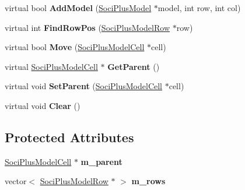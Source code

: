 \begin{DoxyCompactItemize}
\item 
\hypertarget{class_soci_plus_1_1_soci_plus_model_a8b3daf440214ee5e7b8e7fd60ed00c9b}{virtual bool {\bfseries Add\+Model} (\hyperlink{class_soci_plus_1_1_soci_plus_model}{Soci\+Plus\+Model} $\ast$model, int row, int col)}\label{class_soci_plus_1_1_soci_plus_model_a8b3daf440214ee5e7b8e7fd60ed00c9b}

\item 
\hypertarget{class_soci_plus_1_1_soci_plus_model_a190ebe098407b746b61d3beb93cd1d15}{virtual int {\bfseries Find\+Row\+Pos} (\hyperlink{class_soci_plus_1_1_soci_plus_model_row}{Soci\+Plus\+Model\+Row} $\ast$row)}\label{class_soci_plus_1_1_soci_plus_model_a190ebe098407b746b61d3beb93cd1d15}

\item 
\hypertarget{class_soci_plus_1_1_soci_plus_model_a06ac8f54c0d7fa946247badb76215874}{virtual bool {\bfseries Move} (\hyperlink{class_soci_plus_1_1_soci_plus_model_cell}{Soci\+Plus\+Model\+Cell} $\ast$cell)}\label{class_soci_plus_1_1_soci_plus_model_a06ac8f54c0d7fa946247badb76215874}

\item 
\hypertarget{class_soci_plus_1_1_soci_plus_model_abeb97098429cf653afb74e8f5f3924b9}{virtual \hyperlink{class_soci_plus_1_1_soci_plus_model_cell}{Soci\+Plus\+Model\+Cell} $\ast$ {\bfseries Get\+Parent} ()}\label{class_soci_plus_1_1_soci_plus_model_abeb97098429cf653afb74e8f5f3924b9}

\item 
\hypertarget{class_soci_plus_1_1_soci_plus_model_a505fa84dafc6b5575b947c0d893c1bfd}{virtual void {\bfseries Set\+Parent} (\hyperlink{class_soci_plus_1_1_soci_plus_model_cell}{Soci\+Plus\+Model\+Cell} $\ast$cell)}\label{class_soci_plus_1_1_soci_plus_model_a505fa84dafc6b5575b947c0d893c1bfd}

\item 
\hypertarget{class_soci_plus_1_1_soci_plus_model_a04ce1b7e64e54aa65a59445bf0a20c6f}{virtual void {\bfseries Clear} ()}\label{class_soci_plus_1_1_soci_plus_model_a04ce1b7e64e54aa65a59445bf0a20c6f}

\end{DoxyCompactItemize}
\subsection*{Protected Attributes}
\begin{DoxyCompactItemize}
\item 
\hypertarget{class_soci_plus_1_1_soci_plus_model_ab91d5dbff92f62f21bbf5ab4ed7eb0f6}{\hyperlink{class_soci_plus_1_1_soci_plus_model_cell}{Soci\+Plus\+Model\+Cell} $\ast$ {\bfseries m\+\_\+parent}}\label{class_soci_plus_1_1_soci_plus_model_ab91d5dbff92f62f21bbf5ab4ed7eb0f6}

\item 
\hypertarget{class_soci_plus_1_1_soci_plus_model_a141b0e669ba1bfcf312ec692d3cd2945}{vector$<$ \hyperlink{class_soci_plus_1_1_soci_plus_model_row}{Soci\+Plus\+Model\+Row} $\ast$ $>$ {\bfseries m\+\_\+rows}}\label{class_soci_plus_1_1_soci_plus_model_a141b0e669ba1bfcf312ec692d3cd2945}

\end{DoxyCompactItemize}


